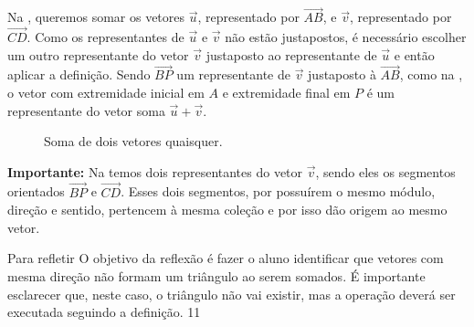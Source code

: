 Na , queremos somar os vetores \(\vec{u}\), representado por \(\overrightarrow{AB}\), e \(\vec{v}\), representado por \(\overrightarrow{CD}\). Como os representantes de \(\vec{u}\) e \(\vec{v}\) não estão justapostos, é necessário escolher um outro representante do vetor \(\vec{v}\) justaposto ao representante de \(\vec{u}\) e então aplicar a definição. Sendo \(\overrightarrow{BP}\) um representante de \(\vec{v}\) justaposto à \(\overrightarrow{AB}\), como na , o vetor com extremidade inicial em \(A\) e extremidade final em \(P\) é um representante do vetor soma \(\vec{u}+\vec{v}\).
\begin{figure}[H]
\centering
{} 
 \caption{Soma de dois vetores quaisquer.} \label{fig-geometria-operacoesvetores-09.1} 
 \end{figure}
\textbf{Importante:} Na  temos dois representantes do vetor \(\vec{v}\), sendo eles os segmentos orientados \(\overrightarrow{BP}\) e \(\overrightarrow{CD}\). Esses dois segmentos, por possuírem o mesmo módulo, direção e sentido, pertencem à mesma coleção e por isso dão origem ao mesmo vetor.

\begin{objectives}{Para refletir}
{O objetivo da reflexão é fazer o aluno identificar que vetores com mesma direção não formam um triângulo ao serem somados. É importante esclarecer que, neste caso, o triângulo não vai existir, mas a operação deverá ser executada seguindo a definição.}
{1}{1}
\end{objectives}


